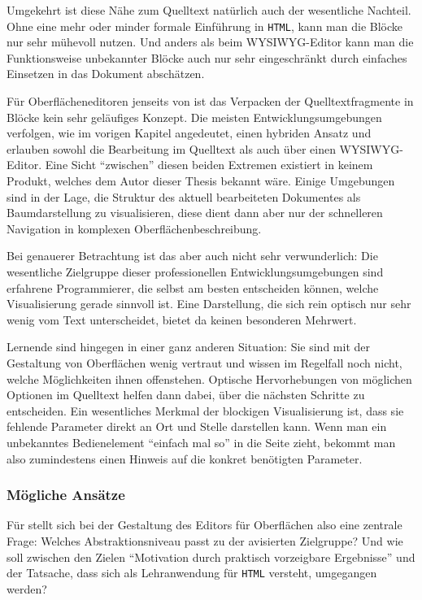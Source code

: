 Umgekehrt ist diese Nähe zum Quelltext natürlich auch der wesentliche Nachteil. Ohne eine mehr oder minder formale Einführung in \texttt{HTML}, kann man die Blöcke nur sehr mühevoll nutzen. Und anders als beim WYSIWYG-Editor kann man die Funktionsweise unbekannter Blöcke auch nur sehr eingeschränkt durch einfaches Einsetzen in das Dokument abschätzen.

Für Oberflächeneditoren jenseits von \idename{} ist das Verpacken der Quelltextfragmente in Blöcke kein sehr geläufiges Konzept. Die meisten Entwicklungsumgebungen verfolgen, wie im vorigen Kapitel angedeutet, einen hybriden Ansatz und erlauben sowohl die Bearbeitung im Quelltext als auch über einen WYSIWYG-Editor. Eine Sicht "`zwischen"' diesen beiden Extremen existiert in keinem Produkt, welches dem Autor dieser Thesis bekannt wäre. Einige Umgebungen sind in der Lage, die Struktur des aktuell bearbeiteten Dokumentes als Baumdarstellung zu visualisieren, diese dient dann aber nur der schnelleren Navigation in komplexen Oberflächenbeschreibung.

Bei genauerer Betrachtung ist das aber auch nicht sehr verwunderlich: Die wesentliche Zielgruppe dieser professionellen Entwicklungsumgebungen sind erfahrene Programmierer, die selbst am besten entscheiden können, welche Visualisierung gerade sinnvoll ist. Eine Darstellung, die sich rein optisch nur sehr wenig vom Text unterscheidet, bietet da keinen besonderen Mehrwert.

Lernende sind hingegen in einer ganz anderen Situation: Sie sind mit der Gestaltung von Oberflächen wenig vertraut und wissen im Regelfall noch nicht, welche Möglichkeiten ihnen offenstehen. Optische Hervorhebungen von möglichen Optionen im Quelltext helfen dann dabei, über die nächsten Schritte zu entscheiden. Ein wesentliches Merkmal der blockigen Visualisierung ist, dass sie fehlende Parameter direkt an Ort und Stelle darstellen kann. Wenn man ein unbekanntes Bedienelement "`einfach mal so"' in die Seite zieht, bekommt man also zumindestens einen Hinweis auf die konkret benötigten Parameter.

\subsubsection{Mögliche Ansätze}

Für \idename{} stellt sich bei der Gestaltung des Editors für Oberflächen also eine zentrale Frage: Welches Abstraktionsniveau passt zu der avisierten Zielgruppe? Und wie soll zwischen den Zielen "`Motivation durch praktisch vorzeigbare Ergebnisse"' und der Tatsache, dass \idename{} sich als Lehranwendung für \texttt{HTML} versteht, umgegangen werden?

